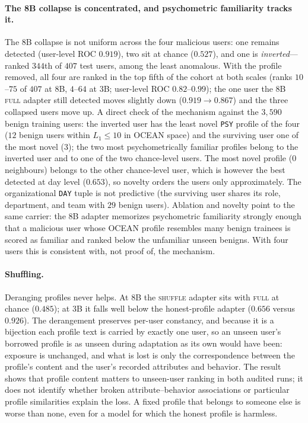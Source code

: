 \documentclass[10pt]{article} %
\begin{document}
\paragraph{The 8B collapse is concentrated, and psychometric familiarity tracks it.}
The $8$B collapse is not uniform across the four malicious users: one remains
detected (user-level ROC $0.919$), two sit at chance ($0.527$), and one is
\emph{inverted}---ranked $344$th of $407$ test users, among the least
anomalous. With the profile removed, all four are ranked in the top fifth of
the cohort at both scales (ranks $10$--$75$ of $407$ at $8$B, $4$--$64$ at
$3$B; user-level ROC $0.82$--$0.99$); the one user the $8$B \textsc{full}
adapter still detected moves slightly down ($0.919\!\to\!0.867$) and the three
collapsed users move up. A direct check of the mechanism against the $3{,}590$
benign training users: the inverted user has the least novel \texttt{PSY}
profile of the four ($12$ benign users within $L_1\!\le\!10$ in OCEAN space)
and the surviving user one of the most novel ($3$); the two most
psychometrically familiar profiles belong to the inverted user and to one of
the two chance-level users. The most novel profile ($0$ neighbours) belongs
to the other chance-level user, which is however the best detected at day
level ($0.653$), so novelty orders the users only approximately. The
organizational \texttt{DAY} tuple is not predictive (the surviving user shares
its role, department, and team with $29$ benign users). Ablation and novelty
point to the same carrier: the $8$B adapter memorizes psychometric
familiarity strongly enough that a malicious user whose OCEAN profile
resembles many benign trainees is scored as familiar and ranked below the
unfamiliar unseen benigns. With four users this is consistent with, not proof
of, the mechanism.

\paragraph{Shuffling.} Deranging profiles never helps. At $8$B the
\textsc{shuffle} adapter sits with \textsc{full} at chance ($0.485$); at $3$B
it falls well below the honest-profile adapter ($0.656$ versus $0.926$).
The derangement preserves per-user constancy, and because it is a bijection
each profile text is carried by exactly one user, so an unseen user's
borrowed profile is as unseen during adaptation as its own would have been:
exposure is unchanged, and what is lost is only the correspondence between
the profile's content and the user's recorded attributes and behavior. The
result shows that profile content matters to unseen-user ranking in both
audited runs; it does not identify whether broken attribute--behavior
associations or particular profile similarities explain the loss. A fixed
profile that belongs to someone else is worse than none, even for a model
for which the honest profile is harmless.
\end{document}
